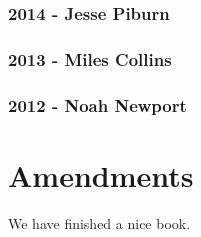 \documentclass[]{book}
\begin{document}
\hypertarget{jesse-piburn-1}{%
\subsection*{\texorpdfstring{\textbf{2014} - Jesse Piburn}{2014 - Jesse Piburn}}\label{jesse-piburn-1}}

\hypertarget{miles-collins-2}{%
\subsection*{\texorpdfstring{\textbf{2013} - Miles Collins}{2013 - Miles Collins}}\label{miles-collins-2}}

\hypertarget{noah-newport-1}{%
\subsection*{\texorpdfstring{\textbf{2012} - Noah Newport}{2012 - Noah Newport}}\label{noah-newport-1}}

\hypertarget{amendments}{%
\chapter{Amendments}\label{amendments}}

We have finished a nice book.


\end{document}
